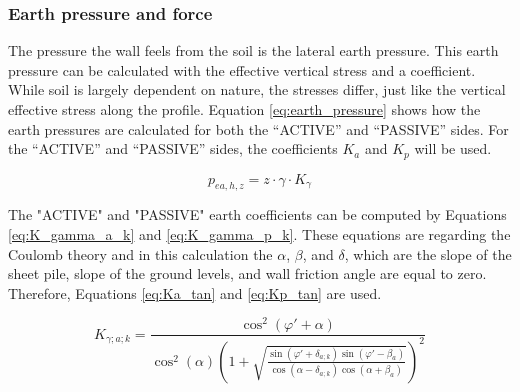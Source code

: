 
\subsubsection{Earth pressure and force}

The pressure the wall feels from the soil is the lateral earth pressure. This earth pressure can be calculated with the effective vertical stress and a coefficient. While soil is largely dependent on nature, the stresses differ, just like the vertical effective stress along the profile. Equation \ref{eq:earth_pressure} shows how the earth pressures are calculated for both the “ACTIVE” and “PASSIVE” sides. For the “ACTIVE” and “PASSIVE” sides, the coefficients $K_{a}$ and $K_{p}$ will be used.

\begin{equation}
    p_{ea,h,z} = z \cdot \gamma \cdot K_{\gamma}
    \label{eq:earth_pressure}
\end{equation}

The "ACTIVE" and "PASSIVE" earth coefficients can be computed by Equations \ref{eq:K_gamma_a_k} and \ref{eq:K_gamma_p_k}. These equations are regarding the Coulomb theory and in this calculation the $\alpha$, $\beta$, and $\delta$, which are the slope of the sheet pile, slope of the ground levels, and wall friction angle are equal to zero. Therefore, Equations \ref{eq:Ka_tan} and \ref{eq:Kp_tan} are used.

\begin{equation}
    K_{\gamma;a;k} =
    \frac{
        \cos^{2}\!\left(\varphi' + \alpha\right)
    }{
        \cos^{2}(\alpha)
        \left(
            1 +
            \sqrt{
                \frac{
                    \sin\!\left(\varphi' + \delta_{a;k}\right)
                    \sin\!\left(\varphi' - \beta_a\right)
                }{
                    \cos\!\left(\alpha - \delta_{a;k}\right)
                    \cos\!\left(\alpha + \beta_a\right)
                }
            }
        \right)^{2}
    }
    \label{eq:K_gamma_a_k}
\end{equation}

